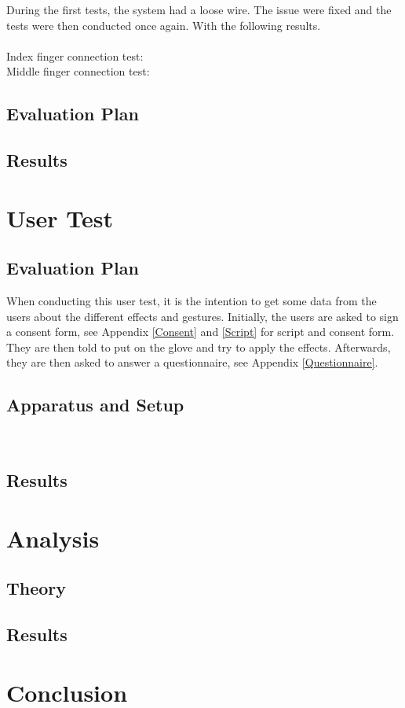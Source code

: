 During the first tests, the system had a loose wire. The issue were fixed and the tests were then conducted once again. With the following results.\\\\

Index finger connection test: \\
Middle finger connection test: \\

\subsection{Evaluation Plan}

\subsection{Results}


\section{User Test}

\subsection{Evaluation Plan}

When conducting this user test, it is the intention to get some data from the users about the different effects and gestures. 
Initially, the users are asked to sign a consent form, see Appendix \ref{Consent} and \ref{Script} for script and consent form. They are then told to put on the glove and try to apply the effects. Afterwards, they are then asked to answer a questionnaire, see Appendix \ref{Questionnaire}. 

\subsection{Apparatus and Setup}



\begin{minipage}{\linewidth}%
\label{Setup}
\end{minipage}\\

\subsection{Results}


\section{Analysis}

\subsection{Theory}

\subsection{Results}


\section{Conclusion}